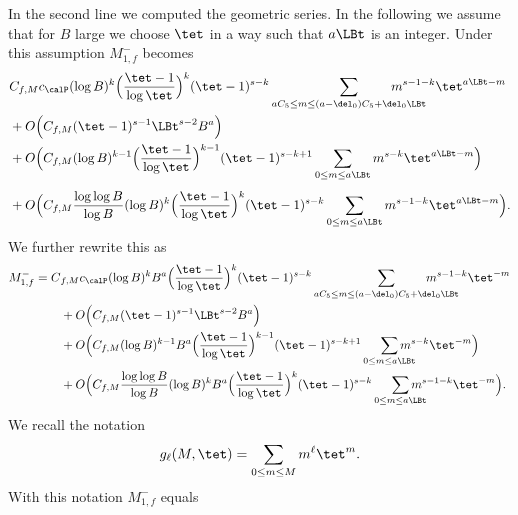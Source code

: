 In the second line we computed the geometric series.
In the following we assume that for $B$ large we choose $\tet$ in a way such that $a \LBt$ is an integer.
Under this assumption $M_{1,f}^-$ becomes\vspace*{-3pt}
\begin{equation*}
\begin{split}
&C_{f,M}c_{\calP} (\log B)^k \Bigl(\frac{\tet -1}{\log \tet}\Bigr)^k (\tet-1)^{s-k} \sum_{aC_5\leq m\leq (a-\del_0) C_5 + \del_0 \LBt}\hspace*{-10mm} m^{s-1-k}\tet^{a\LBt -m} \\
&+O\Bigl(C_{f,M} (\tet -1)^{s-1} \LBt^{s-2} B^{a} \Bigr)\\
&+O\Bigl(C_{f,M} (\log B)^{k-1} \Bigl(\frac{\tet -1}{\log \tet}\Bigr)^{k-1}(\tet-1)^{s-k+1} \sum_{0\leq m\leq a \LBt} m^{s-k} \tet^{a \LBt -m} \Bigr)\\[-12pt]
\\ &+O\Bigl(C_{f,M}\frac{\log \log B}{\log B} (\log B)^k \Bigl(\frac{\tet -1}{\log \tet}\Bigr)^k (\tet-1)^{s-k} \sum_{0\leq m\leq a \LBt} m^{s-1-k}\tet^{a \LBt -m} \Bigr).
\end{split}
\end{equation*}
We further rewrite this as\vspace*{-3pt}
\begin{equation*}
\begin{split}
M_{1,f}^-= C&_{f,M}c_{\calP} (\log B)^kB^{a} \Bigl(\frac{\tet -1}{\log \tet}\Bigr)^k (\tet-1)^{s-k} \sum_{a C_5\leq m\leq (a-\del_0) C_5 + \del_0 \LBt}\hspace*{-10mm} m^{s-1-k}\tet^{-m} \\
&+O\Bigl(C_{f,M} (\tet -1)^{s-1} \LBt^{s-2} B^{a} \Bigr)\\
&+O\Bigl(C_{f,M} (\log B)^{k-1} B^{a} \Bigl(\frac{\tet -1}{\log \tet}\Bigr)^{k-1}(\tet-1)^{s-k+1} \sum_{0\leq m\leq a \LBt} \hspace*{-5mm}m^{s-k} \tet^{-m} \Bigr)\\
&+O\Bigl(C_{f,M}\frac{\log \log B}{\log B} (\log B)^kB^{a} \Bigl(\frac{\tet -1}{\log \tet}\Bigr)^k (\tet-1)^{s-k} \sum_{0\leq m\leq a \LBt}\hspace*{-5mm} m^{s-1-k}\tet^{-m} \Bigr).
\end{split}
\end{equation*}
We recall the notation
\[
g_\ell(M,\tet)=\sum_{0\leq m\leq M} m^\ell \tet^m.
\]
With this notation $M_{1,f}^- $ equals
